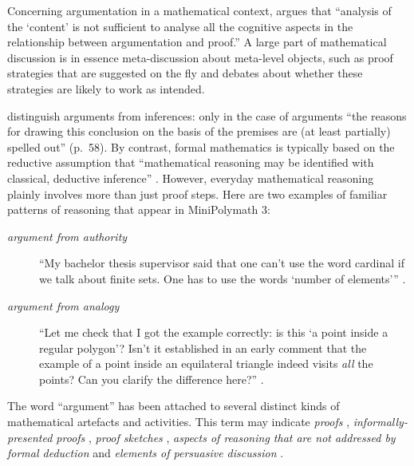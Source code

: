 \documentclass[smallextended,oneside]{svjour3}       %
\let\cite\citep
\begin{document}
Concerning argumentation in a mathematical context, \citet[p.~39]{pedemonte2007} argues that
``analysis of the `content' is not sufficient to analyse all the cognitive aspects in
the relationship between argumentation and proof.''
A large part of mathematical discussion is in essence meta-discussion
about meta-level objects, such as proof strategies that are
suggested on the fly and debates about whether these strategies are
likely to work as intended.

\citet{mercier2011humans} distinguish
arguments from inferences: 
only in the case of arguments ``the reasons for drawing this
conclusion on the basis of the premises are (at least partially)
spelled out'' (p.~58).   
By contrast, formal mathematics is typically based on the reductive assumption that
``mathematical reasoning may be identified with classical, deductive
inference'' \cite[p.~25]{aliseda2003mathematical}.
However, everyday mathematical reasoning plainly involves more than just proof steps.
Here are two examples of familiar patterns of reasoning that appear in MiniPolymath 3:
\begin{description}
\item[\emph{argument from authority}]
``My bachelor thesis supervisor said that one can't use the word cardinal if we talk about finite sets. One has to use the words `number of elements'{''}
\cite[\href{https://wp.me/pAG2F-41\#comment-3418}{19 July, 9:46 pm}]{tao2011imo}.
\item[\emph{argument from analogy}]
``Let me check that I got the example correctly: is this `a point inside a regular polygon'? Isn't it established in an early comment that the example of a point inside an equilateral triangle indeed visits \emph{all} the points? Can you clarify the difference here?''
\cite[\href{https://wp.me/pAG2F-41\#comment-3378}{19 July, 9:19 pm}]{tao2011imo}.
\end{description}



The word ``argument'' has been attached to several distinct kinds of
mathematical artefacts and activities.  This term may indicate
\emph{proofs} \citet{gasteren1990shape},
\emph{informally-presented proofs} \cite{tanswell2015problem},
\emph{proof sketches} \cite{lamport1995write},
\emph{aspects of reasoning that are not addressed by formal deduction} \cite{Aberdein2013} and \emph{elements of persuasive discussion} \cite{Zack2001}.
\end{document}
